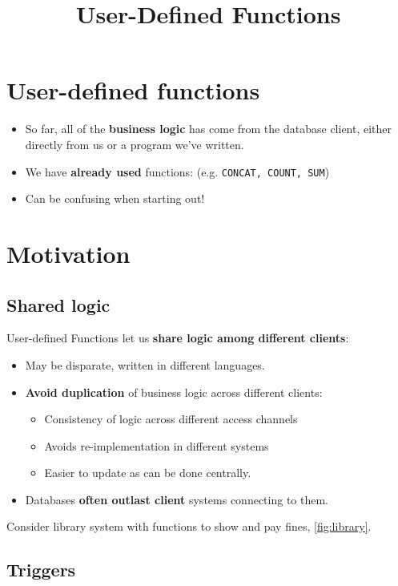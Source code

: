 \documentclass[slides]{pgnotes}
\title{User-Defined Functions}
\begin{document}
\maketitle

\section{User-defined functions}

\begin{itemize}
\item So far, all of the \textbf{business logic} has come from the database client, either directly from us or a program we've written.
\item We have \textbf{already used} functions: (e.g. \texttt{CONCAT, COUNT, SUM})
\item Can be confusing when starting out! 
\end{itemize}

\section{Motivation}

\subsection{Shared logic}

User-defined Functions let us \textbf{share logic among different clients}:
\begin{itemize}
\item May be disparate, written in different languages.
\item \textbf{Avoid duplication} of business logic across different clients:
  \begin{itemize}
  \item Consistency of logic across different access channels
  \item Avoids re-implementation in different systems
  \item Easier to update as can be done centrally.
  \end{itemize}
\item Databases \textbf{often outlast client} systems connecting to them. 
\end{itemize}
Consider library system with functions to show and pay fines, \autoref{fig:library}.



\subsection{Triggers}
\end{document}
